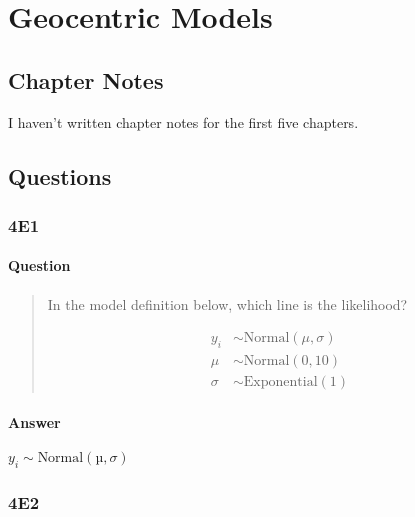 \documentclass[
]{book}
\begin{document}
\hypertarget{geocentric}{%
\chapter{Geocentric Models}\label{geocentric}}

\hypertarget{chapter-notes-3}{%
\section{Chapter Notes}\label{chapter-notes-3}}

I haven't written chapter notes for the first five chapters.

\hypertarget{questions-3}{%
\section{Questions}\label{questions-3}}

\hypertarget{e1-2}{%
\subsection*{4E1}\label{e1-2}}

\hypertarget{question-33}{%
\subsubsection*{Question}\label{question-33}}

\begin{quote}
In the model definition below, which line is the likelihood?

\[
\begin{aligned}
y_i &\sim \text{Normal}(\mu, \sigma) \\
\mu &\sim \text{Normal}(0, 10) \\
\sigma &\sim \text{Exponential}(1)
\end{aligned}
\]
\end{quote}

\hypertarget{answer-33}{%
\subsubsection*{Answer}\label{answer-33}}

\(y_i ∼ \text{Normal}(µ, σ)\)

\hypertarget{e2-2}{%
\subsection*{4E2}\label{e2-2}}
\end{document}
